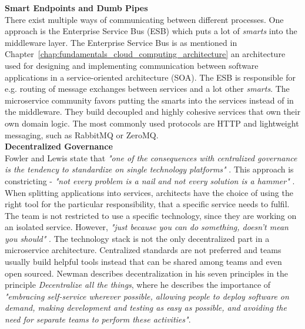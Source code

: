 \noindent\textbf{Smart Endpoints and Dumb Pipes} \\
There exist multiple ways of communicating between different processes. One approach is the Enterprise Service Bus (ESB) which puts a lot of \textit{smarts} into the middleware layer. The Enterprise Service Bus is as mentioned in Chapter~\ref{chap:fundamentals_cloud_computing_architecture} an architecture used for designing and implementing communication between software applications in a service-oriented architecture (SOA). The ESB is responsible for e.g. routing of message exchanges between services and a lot other \textit{smarts}. The microservice community favors putting the smarts into the services instead of in the middleware. They build decoupled and highly cohesive services that own their own domain logic. The most commonly used protocols are HTTP and lightweight messaging, such as RabbitMQ or ZeroMQ. \\

\noindent\textbf{Decentralized Governance}\\
Fowler and Lewis state that \textit{"one of the consequences with centralized governance is the tendency to standardize on single technology platforms"} \cite[p. 7-8]{lewis2014microservices}. This approach is constricting  - \textit{"not every problem is a nail and not every solution is a hammer"} \cite[p. 8]{lewis2014microservices}. When splitting applications into services, architects have the choice of using the right tool for the particular responsibility, that a specific service needs to fulfil. The team is not restricted to use a specific technology, since they are working on an isolated service. However, \textit{"just because you can do something, doesn't mean you should"} \cite[p. 8]{lewis2014microservices}. The technology stack is not the only decentralized part in a microservice architecture. Centralized standards are not preferred and teams usually build helpful tools instead that can be shared among teams and even open sourced. Newman describes decentralization in his seven principles in the principle \textit{Decentralize all the things}, where he describes the importance of \textit{"embracing self-service wherever possible, allowing people to deploy software on demand, making development and testing as easy as possible, and avoiding the need for separate teams to perform these activities"}. \cite[p. 247]{newman2015building} \\

